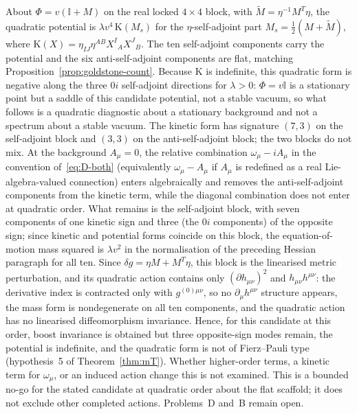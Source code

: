 About \(\Phi=v(\mathbb{I}+M)\) on the real locked \(4\times4\) block, with
\(\tilde M=\eta^{-1}M^{T}\eta\), the quadratic potential is
\(\lambda v^{4}\,\mathrm{K}(M_s)\) for the \(\eta\)-self-adjoint part
\(M_s=\tfrac12(M+\tilde M)\), where
\(\mathrm{K}(X)=\eta_{IJ}\eta^{AB}X^I{}_AX^J{}_B\). The ten self-adjoint
components carry the potential and the six anti-self-adjoint components are
flat, matching Proposition~\ref{prop:goldstone-count}. Because \(\mathrm{K}\)
is indefinite, this quadratic form is negative along the three \(0i\)
self-adjoint directions for \(\lambda>0\): \(\Phi=v\mathbb{I}\) is a stationary
point but a saddle of this candidate potential, not a stable vacuum, so what
follows is a quadratic diagnostic about a stationary background and not a
spectrum about a stable vacuum. The kinetic form has signature \((7,3)\) on the
self-adjoint block and \((3,3)\) on the anti-self-adjoint block; the two
blocks do not mix. At the background \(A_\mu=0\), the relative combination
\(\omega_\mu-iA_\mu\) in the convention of~\eqref{eq:D-both} (equivalently
\(\omega_\mu-A_\mu\) if \(A_\mu\) is redefined as a real Lie-algebra-valued
connection) enters algebraically and removes the anti-self-adjoint components
from the kinetic term, while the diagonal combination does not enter at
quadratic order. What remains is the self-adjoint block, with seven components
of one kinetic sign and three (the \(0i\) components) of the opposite sign;
since kinetic and potential forms coincide on this block, the
equation-of-motion mass squared is \(\lambda v^2\) in the normalisation of the
preceding Hessian paragraph for all ten. Since \(\delta g=\eta M+M^{T}\eta\),
this block is the linearised metric perturbation, and its quadratic action
contains only \((\partial h_{\mu\nu})^2\) and \(h_{\mu\nu}h^{\mu\nu}\): the
derivative index is contracted only with \(g^{(0)\mu\nu}\), so no
\(\partial_\mu h^{\mu\nu}\) structure appears, the mass form is nondegenerate
on all ten components, and the quadratic action has no linearised
diffeomorphism invariance. Hence, for this candidate at this order, boost
invariance is obtained but three opposite-sign modes remain, the potential is
indefinite, and the quadratic form is not of Fierz--Pauli type (hypothesis~5 of
Theorem~\ref{thm:mT}). Whether higher-order terms, a kinetic term for
\(\omega_\mu\), or an induced action change this is not examined. This is a
bounded no-go for the stated candidate at quadratic order about the flat
scaffold; it does not exclude other completed actions. Problems~D and~B remain
open.

